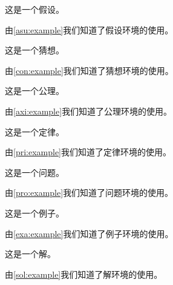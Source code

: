 \begin{assumption}
	这是一个假设。
	\label{asu:example}
\end{assumption}
由\cref{asu:example}我们知道了假设环境的使用。
 
\begin{conjecture}
	这是一个猜想。
	\label{con:example}
\end{conjecture}
由\cref{con:example}我们知道了猜想环境的使用。
 
\begin{axiom}
	这是一个公理。
	\label{axi:example}
\end{axiom}
由\cref{axi:example}我们知道了公理环境的使用。
 
\begin{principle}
	这是一个定律。
	\label{pri:example}
\end{principle}
由\cref{pri:example}我们知道了定律环境的使用。
 
\begin{problem}
	这是一个问题。
	\label{pro:example}
\end{problem}
由\cref{pro:example}我们知道了问题环境的使用。
 
\begin{example}
	这是一个例子。
	\label{exa:example}
\end{example}
由\cref{exa:example}我们知道了例子环境的使用。
 
\begin{solution}
	这是一个解。
	\label{sol:example}
\end{solution}
由\cref{sol:example}我们知道了解环境的使用。

